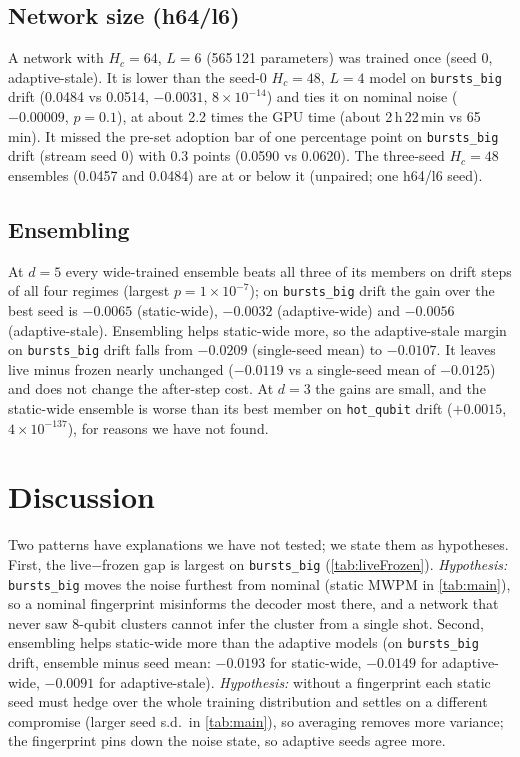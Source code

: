 \documentclass[11pt,a4paper]{article}
\newcommand{\reg}[1]{\texttt{#1}}
\newcommand{\E}[2]{${#1}{\times}10^{-#2}$}
\newcommand{\Eb}[2]{{#1}{\times}10^{-#2}}
\begin{document}
\subsection{Network size (h64/l6)}
A network with $H_c=64$, $L=6$ (565\,121 parameters) was trained once (seed 0, adaptive-stale). It is lower than the
seed-0 $H_c=48$, $L=4$ model on \reg{bursts\_big} drift (0.0484 vs 0.0514, $-0.0031$, \E{8}{14}) and ties it on nominal
noise ($-0.00009$, $p=0.1$), at about 2.2 times the GPU time (about 2\,h\,22\,min vs 65\,min). It missed the pre-set adoption bar of one
percentage point on \reg{bursts\_big} drift (stream seed 0) with 0.3 points (0.0590 vs 0.0620). The three-seed $H_c=48$
ensembles (0.0457 and 0.0484) are at or below it (unpaired; one h64/l6 seed).

\subsection{Ensembling}\label{sec:abl-ens}
At $d=5$ every wide-trained ensemble beats all three of its members on drift steps of all four regimes (largest
$p=\Eb{1}{7}$); on \reg{bursts\_big} drift the gain over the best seed is $-0.0065$ (static-wide), $-0.0032$
(adaptive-wide) and $-0.0056$ (adaptive-stale). Ensembling helps static-wide more, so the adaptive-stale margin on
\reg{bursts\_big} drift falls from $-0.0209$ (single-seed mean) to $-0.0107$. It leaves live minus frozen nearly unchanged
($-0.0119$ vs a single-seed mean of $-0.0125$) and does not change the after-step cost. At $d=3$ the gains are small, and
the static-wide ensemble is worse than its best member on \reg{hot\_qubit} drift ($+0.0015$, \E{4}{137}), for reasons we
have not found.

\section{Discussion}\label{sec:discussion}

Two patterns have explanations we have not tested; we state them as hypotheses. First, the live$-$frozen gap is
largest on \reg{bursts\_big} (\cref{tab:liveFrozen}). \emph{Hypothesis:} \reg{bursts\_big} moves the noise furthest from nominal (static MWPM in \cref{tab:main}), so a nominal fingerprint misinforms the decoder most there, and a network that
never saw 8-qubit clusters cannot infer the cluster from a single shot. Second, ensembling helps static-wide more than
the adaptive models (on \reg{bursts\_big} drift, ensemble minus seed mean: $-0.0193$ for static-wide, $-0.0149$ for
adaptive-wide, $-0.0091$ for adaptive-stale). \emph{Hypothesis:} without a fingerprint each static seed must hedge over
the whole training distribution and settles on a different compromise (larger seed s.d.\ in \cref{tab:main}), so averaging removes more variance; the fingerprint pins down the noise state, so adaptive seeds
agree more.
\end{document}
